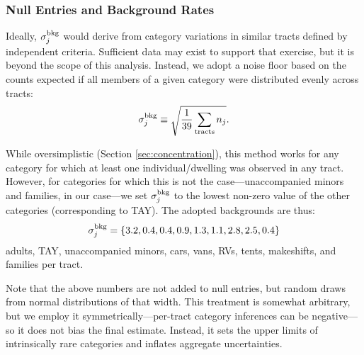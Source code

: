 \documentclass[11pt,twocolumn]{article}
\begin{document}
\subsubsection{Null Entries and Background Rates}
\label{sec:nulls}

Ideally, $\sigma_{j}^{\rm bkg}$ would derive from category variations in similar tracts defined 
by independent criteria. Sufficient data may exist to support that exercise, but it is beyond the scope 
of this analysis. Instead, we adopt a noise floor based on the counts expected if all members of a given 
category were distributed evenly across tracts:
\begin{equation}
	\sigma_{j}^{\rm bkg} \equiv \sqrt{\frac{1}{39}\sum_{\rm tracts}n_{j}}.
\end{equation}

While oversimplistic (Section \ref{sec:concentration}), this method works for any category
for which at least one individual/dwelling was observed in any tract. However, for categories for 
which this is not the case---unaccompanied minors and families, in our case---we set 
$\sigma_{j}^{\rm bkg}$ to the lowest non-zero value of the other categories (corresponding to 
TAY). The adopted backgrounds are thus: 
\begin{equation}
	\sigma_{j}^{\rm bkg}=\{3.2, 0.4, 0.4, 0.9, 1.3, 1.1, 2.8, 2.5, 0.4\}
\end{equation}
adults, TAY, unaccompanied minors, cars, vans, RVs, tents, makeshifts, and families per tract. 

Note that the above numbers are not added to null entries, but random draws from normal distributions
of that width. This treatment is somewhat arbitrary, but we employ it symmetrically---per-tract category 
inferences can be negative---so it does not bias the final estimate. Instead, it sets the upper limits of 
intrinsically rare categories and inflates aggregate uncertainties.
\end{document}
